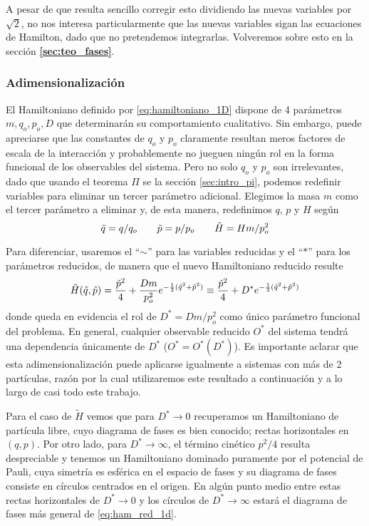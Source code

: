 A pesar de que resulta sencillo corregir esto dividiendo las nuevas variables por $\sqrt{2}$, no nos interesa particularmente que las nuevas variables sigan las ecuaciones de Hamilton, dado que no pretendemos integrarlas. Volveremos sobre esto en la sección \textbf{\ref{sec:teo_fases}}.


\subsubsection{Adimensionalización}{\label{sec:adim_choque1d}}

El Hamiltoniano definido por \eqref{eq:hamiltoniano_1D} dispone de 4 parámetros $m, q_o, p_o, D$ que determinarán su comportamiento cualitativo.
Sin embargo, puede apreciarse que las constantes de $q_o$ y $p_o$ claramente resultan meros factores de escala de la interacción y probablemente no jueguen ningún rol en la forma funcional de los observables del sistema.
Pero no solo $q_o$ y $p_o$ son irrelevantes, dado que usando el teorema $\Pi$ se la sección \ref{sec:intro_pi}, podemos redefinir variables para eliminar un tercer parámetro adicional.
Elegimos la masa $m$ como el tercer parámetro a eliminar y, de esta manera, redefinimos $q$, $p$ y $H$ según
\begin{equation}{\label{eq:unidades_red}}
\tilde{q} = q/q_o \qquad \tilde{p} = p/p_o \qquad \tilde{H} = Hm/p_o^2
\end{equation}

Para diferenciar, usaremos el ``$\sim$'' para las variables reducidas y el ``$*$'' para los parámetros reducidos, de manera que el nuevo Hamiltoniano reducido resulte
\begin{equation}{\label{eq:ham_red_1d}}
\tilde{H}(\tilde{q}, \tilde{p}) = \frac{\tilde{p}^2}{4} + \frac{Dm}{p_o^2}e^{-\frac{1}{2}(\tilde{q}^2+\tilde{p}^2)} \equiv \frac{\tilde{p}^2}{4} + D^* e^{-\frac{1}{2}(\tilde{q}^2+\tilde{p}^2)}
\end{equation}
donde queda en evidencia el rol de $D^* = Dm/p_o^2$ como único parámetro funcional del problema.
En general, cualquier observable reducido $O^*$ del sistema tendrá una dependencia únicamente de $D^*$ ($O^* = O^*(D^*)$).
Es importante aclarar que esta adimensionalización puede aplicarse igualmente a sistemas con más de 2 partículas, razón por la cual utilizaremos este resultado a continuación y a lo largo de casi todo este trabajo.

Para el caso de $\tilde{H}$ vemos que para $D^*\to 0$ recuperamos un Hamiltoniano de partícula libre, cuyo diagrama de fases es bien conocido; rectas horizontales en $(q,p)$.
Por otro lado, para $D^*\to \infty$, el término cinético $p^2/4$ resulta despreciable y tenemos un Hamiltoniano dominado puramente por el potencial de Pauli, cuya simetría es 
esférica en el espacio de fases y su diagrama de fases consiste en círculos centrados en el origen.
En algún punto medio entre estas rectas horizontales de $D^*\to0$ y los círculos de $D^*\to\infty$ estará el diagrama de fases más general de \eqref{eq:ham_red_1d}.

